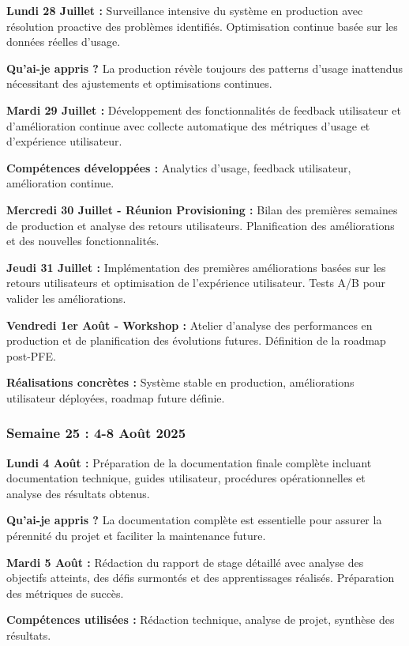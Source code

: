 \documentclass[a4paper,12pt]{article}
\begin{document}
\textbf{Lundi 28 Juillet :}
Surveillance intensive du système en production avec résolution proactive des problèmes identifiés. Optimisation continue basée sur les données réelles d'usage.

\textbf{Qu'ai-je appris ?} La production révèle toujours des patterns d'usage inattendus nécessitant des ajustements et optimisations continues.

\textbf{Mardi 29 Juillet :}
Développement des fonctionnalités de feedback utilisateur et d'amélioration continue avec collecte automatique des métriques d'usage et d'expérience utilisateur.

\textbf{Compétences développées :} Analytics d'usage, feedback utilisateur, amélioration continue.

\textbf{Mercredi 30 Juillet - Réunion Provisioning :}
Bilan des premières semaines de production et analyse des retours utilisateurs. Planification des améliorations et des nouvelles fonctionnalités.

\textbf{Jeudi 31 Juillet :}
Implémentation des premières améliorations basées sur les retours utilisateurs et optimisation de l'expérience utilisateur. Tests A/B pour valider les améliorations.

\textbf{Vendredi 1er Août - Workshop :}
Atelier d'analyse des performances en production et de planification des évolutions futures. Définition de la roadmap post-PFE.

\textbf{Réalisations concrètes :} Système stable en production, améliorations utilisateur déployées, roadmap future définie.

\subsubsection{Semaine 25 : 4-8 Août 2025}

\textbf{Lundi 4 Août :}
Préparation de la documentation finale complète incluant documentation technique, guides utilisateur, procédures opérationnelles et analyse des résultats obtenus.

\textbf{Qu'ai-je appris ?} La documentation complète est essentielle pour assurer la pérennité du projet et faciliter la maintenance future.

\textbf{Mardi 5 Août :}
Rédaction du rapport de stage détaillé avec analyse des objectifs atteints, des défis surmontés et des apprentissages réalisés. Préparation des métriques de succès.

\textbf{Compétences utilisées :} Rédaction technique, analyse de projet, synthèse des résultats.
\end{document}
